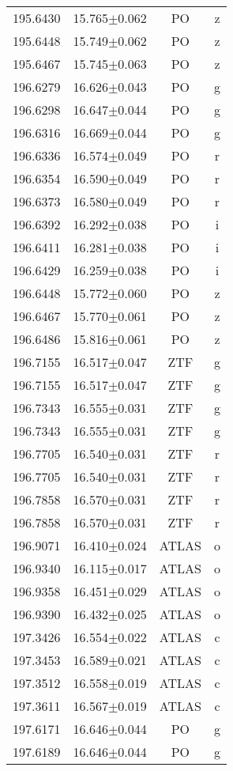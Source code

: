 \begin{table}
\begin{tabular}{cccc}
195.6430 & 15.765$\pm$0.062 & PO & z \\
195.6448 & 15.749$\pm$0.062 & PO & z \\
195.6467 & 15.745$\pm$0.063 & PO & z \\
196.6279 & 16.626$\pm$0.043 & PO & g \\
196.6298 & 16.647$\pm$0.044 & PO & g \\
196.6316 & 16.669$\pm$0.044 & PO & g \\
196.6336 & 16.574$\pm$0.049 & PO & r \\
196.6354 & 16.590$\pm$0.049 & PO & r \\
196.6373 & 16.580$\pm$0.049 & PO & r \\
196.6392 & 16.292$\pm$0.038 & PO & i \\
196.6411 & 16.281$\pm$0.038 & PO & i \\
196.6429 & 16.259$\pm$0.038 & PO & i \\
196.6448 & 15.772$\pm$0.060 & PO & z \\
196.6467 & 15.770$\pm$0.061 & PO & z \\
196.6486 & 15.816$\pm$0.061 & PO & z \\
196.7155 & 16.517$\pm$0.047 & ZTF & g \\
196.7155 & 16.517$\pm$0.047 & ZTF & g \\
196.7343 & 16.555$\pm$0.031 & ZTF & g \\
196.7343 & 16.555$\pm$0.031 & ZTF & g \\
196.7705 & 16.540$\pm$0.031 & ZTF & r \\
196.7705 & 16.540$\pm$0.031 & ZTF & r \\
196.7858 & 16.570$\pm$0.031 & ZTF & r \\
196.7858 & 16.570$\pm$0.031 & ZTF & r \\
196.9071 & 16.410$\pm$0.024 & ATLAS & o \\
196.9340 & 16.115$\pm$0.017 & ATLAS & o \\
196.9358 & 16.451$\pm$0.029 & ATLAS & o \\
196.9390 & 16.432$\pm$0.025 & ATLAS & o \\
197.3426 & 16.554$\pm$0.022 & ATLAS & c \\
197.3453 & 16.589$\pm$0.021 & ATLAS & c \\
197.3512 & 16.558$\pm$0.019 & ATLAS & c \\
197.3611 & 16.567$\pm$0.019 & ATLAS & c \\
197.6171 & 16.646$\pm$0.044 & PO & g \\
197.6189 & 16.646$\pm$0.044 & PO & g \\

\end{tabular}
\end{table}
